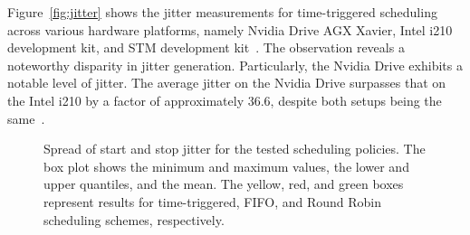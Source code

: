      Figure~\ref{fig:jitter} shows the jitter measurements for time-triggered scheduling across various hardware platforms, namely Nvidia Drive AGX Xavier, Intel i210 development kit, and STM development kit~\cite{Intel, STM, NVIDIA}. The observation reveals a noteworthy disparity in jitter generation. Particularly, the Nvidia Drive exhibits a notable level of jitter. The average jitter on the Nvidia Drive surpasses that on the Intel i210 by a factor of approximately 36.6, despite both setups being the same~\cite{askaripoor2023designer}.

 
      
     \begin{figure}[ht]
	\centering
	\caption{Spread of start and stop jitter for the tested scheduling policies. The box plot shows the minimum and maximum values, the lower and upper quantiles, and the mean. The yellow, red, and green boxes represent results for time-triggered, FIFO, and Round Robin scheduling schemes, respectively.}
	\label{fig:jitter_boxplot}
    \end{figure}
    
